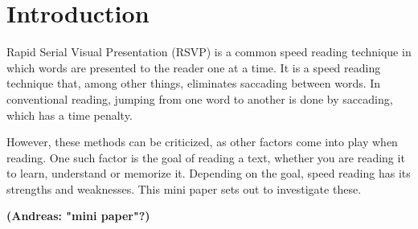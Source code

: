 \section{Introduction}
Rapid Serial Visual Presentation (RSVP) is a common speed reading technique in which words are presented to the reader one at a time. It is a speed reading technique that, among other things, eliminates saccading between words. In conventional reading, jumping from one word to another is done by saccading, which has a time penalty.

However, these methods can be criticized, as other factors come into play when reading. One such factor is the goal of reading a text, whether you are reading it to learn, understand or memorize it. Depending on the goal, speed reading has its strengths and weaknesses. This mini paper sets out to investigate these.

\textbf{(Andreas: "mini paper"?)}